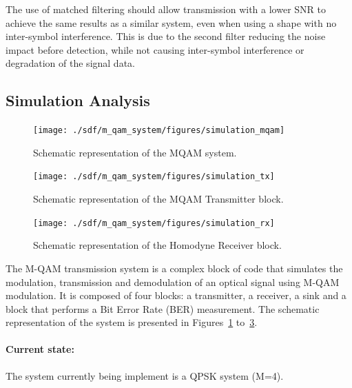 The use of matched filtering should allow transmission with a lower SNR to achieve the same results as a similar system, even when using a shape with no inter-symbol interference. This is due to the second filter reducing the noise impact before detection, while not causing inter-symbol interference or degradation of the signal data.

\subsection{Simulation Analysis}

\begin{figure}[h]
	\centering
	\texttt{[image: ./sdf/m\_qam\_system/figures/simulation\_mqam]}
	\caption{Schematic representation of the MQAM system.}\label{fig:MQAM_system_block_diagram}
\end{figure}


\begin{figure}[h]
	\centering
	\texttt{[image: ./sdf/m\_qam\_system/figures/simulation\_tx]}
	\caption{Schematic representation of the MQAM Transmitter block.}\label{fig:simulation_tx}
\end{figure}


\begin{figure}[h]
	\centering
	\texttt{[image: ./sdf/m\_qam\_system/figures/simulation\_rx]}
	\caption{Schematic representation of the Homodyne Receiver block.}\label{fig:simulation_rx}
\end{figure}

The M-QAM transmission system is a complex block of code that simulates the modulation, transmission and
demodulation of an optical signal using M-QAM modulation.
It is composed of four blocks: a transmitter, a receiver, a sink and a block that performs a Bit Error Rate (BER) measurement. The schematic representation of the
system is presented in Figures~\ref{fig:MQAM_system_block_diagram} to~\ref{fig:simulation_rx}.
	
\paragraph{Current state:} The system currently being implement is a QPSK system (M=4).

